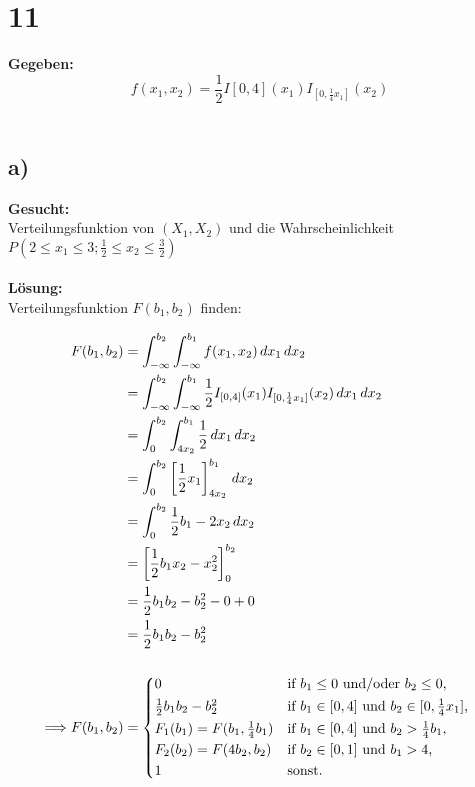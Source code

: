 \documentclass{article}
\begin{document}
\section*{11}
\textbf{Gegeben:}\\

\[f(x_{1}, x_{2}) =\frac{1}{2}I{[0,4]}(x_1)I_{[0,\frac{1}{4}x_{1}]}(x_{2}) \] \\

\subsection*{a)} 
\textbf{Gesucht: } \\

Verteilungsfunktion von $(X_{1}, X_{2})$ und die Wahrscheinlichkeit $P(2\leq x_{1}\leq 3 ; \frac{1}{2} \leq x_{2} \leq \frac{3}{2})$ \\ \\
\textbf{Lösung:}\\

Verteilungsfunktion $F(b_1, b_2)$ finden: 

\begin{align*}
    F(b_1, b_2) &= \int_{-\infty}^{b_2} \int_{-\infty}^{b_1} f(x_1, x_2) \, dx_1 \, dx_2 \\
    &= \int_{-\infty}^{b_2} \int_{-\infty}^{b_1} \frac{1}{2} I_{[0,4]}(x_1) I_{[0,\frac{1}{4}x_1]}(x_2) \, dx_1 \, dx_2 \\
    &= \int_{0}^{b_2} \int_{4x_2}^{b_1} \frac{1}{2} \, dx_1 \, dx_2 \\ 
    &= \int_{0}^{b_2} \left[ \frac{1}{2} x_1 \right]_{4x_2}^{b_1} \, dx_2 \\
    &= \int_{0}^{b_2} \frac{1}{2} b_1 - 2x_2 \, dx_2 \\
    &= \left[ \frac{1}{2} b_1 x_2 - x_2^2 \right]_0^{b_2} \\
    &= \frac{1}{2} b_1 b_2 - b_2^2 - 0 + 0 \\
    &= \frac{1}{2} b_1 b_2 - b_2^2 \\ \\
    \Longrightarrow F(b_1, b_2) &= 
    \begin{cases*}
        0 & if $b_1 \leq 0$ und/oder $b_2 \leq 0$, \\
        \frac{1}{2} b_1 b_2 - b_2^2 & if  $b_1 \in [0,4]$ und  $b_{2} \in [0, \frac{1}{4}x_1]$, \\
        F_1(b_{1}) = F(b_1, \frac{1}{4}b_1) & if $b_{1} \in [0,4]$ und $b_{2} > \frac{1}{4} b_1$, \\
        F_2(b_{2}) = F(4b_2, b_2) & if $b_{2} \in [0,1]$ und $b_1 > 4$, \\
        1 & sonst.
    \end{cases*}
\end{align*}
\end{document}
